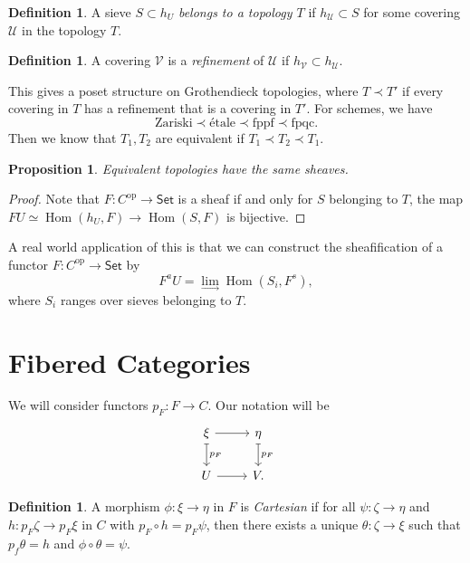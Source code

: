 \documentclass[leqno, openany]{memoir}
\newtheorem{prop}[thm]{Proposition}
\theoremstyle{definition}
\newtheorem{defn}[thm]{Definition}
\theoremstyle{remark}
\theoremstyle{plain}
\theoremstyle{definition}
\theoremstyle{remark}
\newcommand{\mc}[1]{\mathcal{#1}}
\newcommand{\mr}[1]{\mathrm{#1}}
\newcommand{\ms}[1]{\mathsf{#1}}
\DeclareMathOperator{\Hom}{Hom}
\begin{document}
\begin{defn}
    A sieve $S \subset h_U$ \textit{belongs to a topology $T$} if $h_{\mc{U}} \subset S$ for some covering $\mc{U}$ in the topology $T$. 
\end{defn}

\begin{defn}
    A covering $\mc{V}$ is a \textit{refinement} of $\mc{U}$ if $h_{\mc{V}} \subset h_{\mc{U}}$. 
\end{defn}

This gives a poset structure on Grothendieck topologies, where $T \prec T'$ if every covering in $T$ has a refinement that is a covering in $T'$. For schemes, we have
\[ \text{Zariski} \prec \text{\'etale} \prec \text{fppf} \prec \text{fpqc}. \]
Then we know that $T_1, T_2$ are equivalent if $T_1 \prec T_2 \prec T_1$.

\begin{prop}
    Equivalent topologies have the same sheaves.
\end{prop}

\begin{proof}
    Note that $F \colon C^{\mr{op}} \to \ms{Set}$ is a sheaf if and only for $S$ belonging to $T$, the map $FU \simeq \Hom(h_U,F) \to \Hom(S,F)$ is bijective.
\end{proof}

A real world application of this is that we can construct the sheafification of a functor $F \colon C^{\mr{op}} \to \ms{Set}$ by
\[ F^a U = \lim_{\to} \Hom(S_i, F^s), \]
where $S_i$ ranges over sieves belonging to $T$.

\section{Fibered Categories}%
\label{sec:fibered_categories}

We will consider functors $p_F \colon F \to C$. Our notation will be
\begin{equation*}
\begin{tikzcd}
    \xi \arrow{r} \arrow[mapsto]{d}{p_F} & \eta \arrow[mapsto]{d}{p_F} \\
    U \arrow{r} & V.
\end{tikzcd}
\end{equation*}

\begin{defn}
    A morphism $\phi \colon \xi \to \eta$ in $F$ is \textit{Cartesian} if for all $\psi \colon \zeta \to \eta$ and $h \colon p_F \zeta \to p_F \xi$ in $C$ with $p_F \circ h = p_F \psi$, then there exists a unique $\theta \colon \zeta \to \xi$ such that $p_f \theta = h$ and $\phi \circ \theta = \psi$. 
\end{defn}
\end{document}
